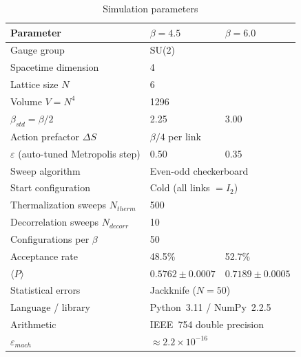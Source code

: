 \documentclass[12pt,a4paper]{article}
\def\mathrm#1{#1}%
\begin{document}
	\begin{table}[htbp]
		\centering
		\caption{Simulation parameters}
		\label{tab:simparams}
		\begin{tabular}{lll}
			\toprule
			Parameter & $\beta=4.5$ & $\beta=6.0$\\
			\midrule
			Gauge group                                    & \multicolumn{2}{l}{SU(2)}\\
			Spacetime dimension                            & \multicolumn{2}{l}{4}\\
			Lattice size $N$                               & \multicolumn{2}{l}{6}\\
			Volume $V=N^4$                                 & \multicolumn{2}{l}{1296}\\
			$\beta_{\mathrm{std}}=\beta/2$                 & 2.25 & 3.00\\
			Action prefactor $\Delta S$                    & \multicolumn{2}{l}{$\beta/4$ per link}\\
			$\varepsilon$ (auto-tuned Metropolis step)     & 0.50 & 0.35\\
			Sweep algorithm                                & \multicolumn{2}{l}{Even-odd checkerboard}\\
			Start configuration                            & \multicolumn{2}{l}{Cold (all links $=I_2$)}\\
			Thermalization sweeps $N_{\mathrm{therm}}$     & \multicolumn{2}{l}{500}\\
			Decorrelation sweeps $N_{\mathrm{decorr}}$     & \multicolumn{2}{l}{10}\\
			Configurations per $\beta$                     & \multicolumn{2}{l}{50}\\
			Acceptance rate                                & 48.5\% & 52.7\%\\
			$\langle P\rangle$                             & $0.5762\pm0.0007$ & $0.7189\pm0.0005$\\
			Statistical errors                             & \multicolumn{2}{l}{Jackknife ($N=50$)}\\
			Language / library                             & \multicolumn{2}{l}{Python~3.11 / NumPy~2.2.5}\\
			Arithmetic                                     & \multicolumn{2}{l}{IEEE~754 double precision}\\
			$\varepsilon_{\mathrm{mach}}$                  & \multicolumn{2}{l}{$\approx2.2\times10^{-16}$}\\
			\bottomrule
		\end{tabular}
	\end{table}
	
\end{document}
